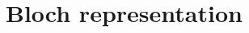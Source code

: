 \documentclass[11pt,a4paper]{report}
\begin{document}




\section{Bloch representation}



\clearpage
 
 
\end{document}
